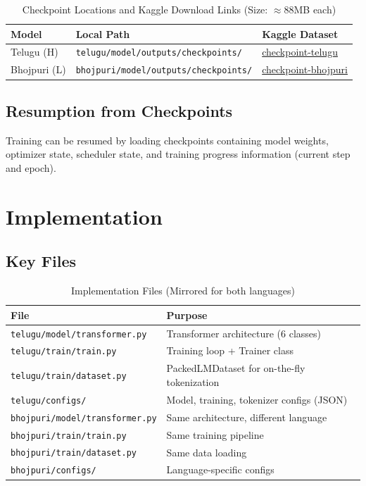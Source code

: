 \documentclass[11pt,a4paper]{article}
\begin{document}
\begin{table}[H]
\centering
\begin{tabular}{llp{4cm}}
\toprule
\textbf{Model} & \textbf{Local Path} & \textbf{Kaggle Dataset} \\
\midrule
Telugu (H) & \texttt{telugu/model/outputs/checkpoints/} & \href{https://kaggle.com/datasets/kspsvln/checkpoint-telugu}{checkpoint-telugu} \\
Bhojpuri (L) & \texttt{bhojpuri/model/outputs/checkpoints/} & \href{https://kaggle.com/datasets/kspsvln/checkpoint-bhojpuri}{checkpoint-bhojpuri} \\
\bottomrule
\end{tabular}
\caption{Checkpoint Locations and Kaggle Download Links (Size: $\approx 88$MB each)}
\end{table}

\subsection{Resumption from Checkpoints}

Training can be resumed by loading checkpoints containing model weights, optimizer state, scheduler state, and training progress information (current step and epoch).

\section{Implementation}

\subsection{Key Files}

\begin{table}[H]
\centering
\begin{tabular}{ll}
\toprule
\textbf{File} & \textbf{Purpose} \\
\midrule
\texttt{telugu/model/transformer.py} & Transformer architecture (6 classes) \\
\texttt{telugu/train/train.py} & Training loop + Trainer class \\
\texttt{telugu/train/dataset.py} & PackedLMDataset for on-the-fly tokenization \\
\texttt{telugu/configs/} & Model, training, tokenizer configs (JSON) \\
\midrule
\texttt{bhojpuri/model/transformer.py} & Same architecture, different language \\
\texttt{bhojpuri/train/train.py} & Same training pipeline \\
\texttt{bhojpuri/train/dataset.py} & Same data loading \\
\texttt{bhojpuri/configs/} & Language-specific configs \\
\bottomrule
\end{tabular}
\caption{Implementation Files (Mirrored for both languages)}
\end{table}
\end{document}
